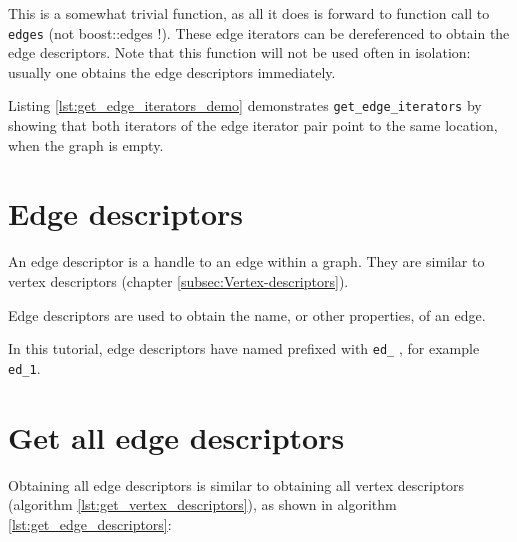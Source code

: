 

This is a somewhat trivial function, as all it does is forward to function
call to \verb;edges; 
(not boost::edges !). 
These edge iterators can be dereferenced to obtain the edge descriptors.
Note that this function will not be used often in isolation: usually one
obtains the edge descriptors immediately.

Listing \ref{lst:get_edge_iterators_demo}
demonstrates \verb;get_edge_iterators; by showing that both iterators of the
edge iterator pair point to the same location, when the graph is empty.



\section{Edge descriptors}
\label{subsec:Edge-descriptors}

An edge descriptor is a handle to an edge within a graph.
They are similar to vertex descriptors (chapter \ref{subsec:Vertex-descriptors}).

Edge descriptors are used to obtain the name, or other properties, of an edge.

In this tutorial, edge descriptors have named prefixed with \verb;ed_;
, for example \verb;ed_1;.

\section{Get all edge descriptors}
\label{subsec:get_edge_descriptors}

Obtaining all edge descriptors is similar to obtaining all vertex descriptors
(algorithm \ref{lst:get_vertex_descriptors}), 
as shown in algorithm \ref{lst:get_edge_descriptors}:



